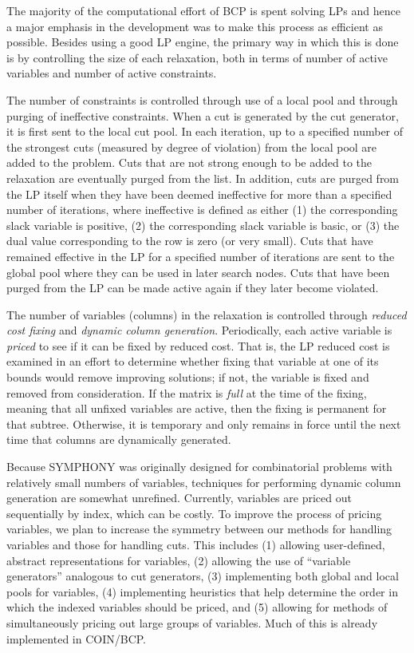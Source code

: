 The majority of the computational effort of BCP is spent
solving LPs and hence a major emphasis in the development was to make
this process as efficient as possible. Besides using a good LP engine,
the primary way in which this is done is by controlling the size of
each relaxation, both in terms of number of active variables and
number of active constraints. 

The number of constraints is controlled through use of a local
pool and through purging of ineffective constraints. When a cut is
generated by the cut generator, it is first sent to the local cut
pool. In each iteration, up to a specified number of the strongest
cuts (measured by degree of violation) from the local pool are added
to the problem. Cuts that are not strong enough to be added to the
relaxation are eventually purged from the list. In addition, cuts are
purged from the LP itself when they have been deemed ineffective for
more than a specified number of iterations, where ineffective is
defined as either (1) the corresponding slack variable is positive,
(2) the corresponding slack variable is basic, or (3) the dual value
corresponding to the row is zero (or very small). Cuts that have
remained effective in the LP for a specified number of iterations are
sent to the global pool where they can be used in later search nodes.
Cuts that have been purged from the LP can be made active again if
they later become violated.

The number of variables (columns) in the relaxation is controlled
through {\em reduced cost fixing} and {\em dynamic column generation}.
Periodically, each active variable is {\em priced} to see if it can be
fixed by reduced cost. That is, the LP reduced cost is examined in an
effort  to determine whether fixing that variable at
one of its bounds would remove improving solutions; if not, the
variable is fixed and removed from consideration. If the matrix is
{\em full} at the time of the fixing, meaning that all unfixed
variables are active, then the fixing is permanent for that subtree.
Otherwise, it is temporary and only remains in force until the next
time that columns are dynamically generated.

Because SYMPHONY was originally designed for combinatorial problems
with relatively small numbers of variables, techniques for performing
dynamic column generation are somewhat unrefined. Currently, variables
are priced out sequentially by index, which can be costly. To improve
the process of pricing variables, we plan to increase the symmetry
between our methods for handling variables and those for handling
cuts. This includes (1) allowing user-defined, abstract
representations for variables, (2) allowing the use of ``variable
generators'' analogous to cut generators, (3) implementing both global
and local pools for variables, (4) implementing heuristics that help
determine the order in which the indexed variables should be priced,
and (5) allowing for methods of simultaneously pricing out large
groups of variables. Much of this is already implemented in COIN/BCP.

